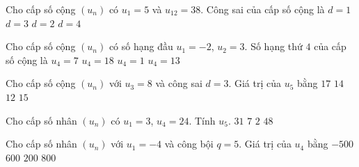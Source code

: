 \begin{ex}%
Cho cấp số cộng $(u_n)$ có $u_1 = 5$ và $u_{12} = 38$. Công sai của cấp số cộng là
	\choice
	{$d=1$}
	{\True $d=3$}
	{$d=2$}
	{$d=4$}
\end{ex}

\begin{ex}%
 	Cho cấp số cộng $(u_n)$ có số hạng đầu $u_1 = -2$, $u_2 = 3$. Số hạng thứ $4$ của cấp số cộng là
 	\choice
 	{$u_4 = 7$}
 	{$u_4 = 18$}
 	{$u_4 = 1$}
 	{\True $u_4 = 13$}
 \end{ex}

\begin{ex}%
	Cho cấp số cộng $\left(u_n\right)$ với $u_3=8$ và công sai $d=3$. Giá trị của $u_5$ bằng
	\choice
	{$17$}
	{\True $14$}
	{$12$}
	{$15$}
\end{ex}

\begin{ex}%
	Cho cấp số nhân $(u_n)$ có $u_1=3$, $u_4=24$. Tính $u_5$.
	\choice
	{$31$}
	{$7$}
	{$2$}
	{\True $48$}
\end{ex}

\begin{ex}%
	Cho cấp số nhân $\left(u_n\right)$ với $u_1=-4$ và công bội $q=5$. Giá trị của $u_4$ bằng
	\choice
	{\True $-500$}
	{$600$}
	{$200$}
	{$800$}
\end{ex}

